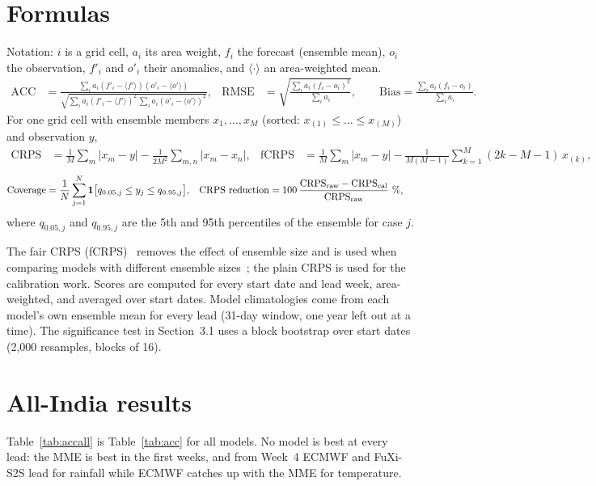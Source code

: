 \documentclass[11pt,a4paper]{article}
\begin{document}
\section{Formulas}
\label{app:scores}
Notation: $i$ is a grid cell, $a_i$ its area weight, $f_i$ the forecast (ensemble mean), $o_i$ the observation, $f'_i$ and $o'_i$
their anomalies, and $\langle\cdot\rangle$ an area-weighted mean.
\begin{align*}
\mathrm{ACC}&=\frac{\sum_i a_i(f'_i-\langle f'\rangle)(o'_i-\langle o'\rangle)}
{\sqrt{\sum_i a_i(f'_i-\langle f'\rangle)^2\,\sum_i a_i(o'_i-\langle o'\rangle)^2}}, &
\mathrm{RMSE}&=\sqrt{\frac{\sum_i a_i(f_i-o_i)^2}{\sum_i a_i}}, \qquad
\mathrm{Bias}=\frac{\sum_i a_i(f_i-o_i)}{\sum_i a_i}.
\end{align*}
For one grid cell with ensemble members $x_1,\dots,x_M$ (sorted: $x_{(1)}\le\dots\le x_{(M)}$) and observation $y$,
\begin{align*}
\mathrm{CRPS}&=\frac{1}{M}\sum_{m}|x_m-y|-\frac{1}{2M^2}\sum_{m,n}|x_m-x_n|, &
\mathrm{fCRPS}&=\frac{1}{M}\sum_{m}|x_m-y|-\frac{1}{M(M-1)}\sum_{k=1}^{M}(2k-M-1)\,x_{(k)},
\end{align*}
\vspace{-0.8\baselineskip}
\begin{align*}
\mathrm{Coverage}&=\frac{1}{N}\sum_{j=1}^{N}\mathbf{1}\big[q_{0.05,j}\le y_j\le q_{0.95,j}\big], &
\text{CRPS reduction}&=100\,\frac{\mathrm{CRPS}_{\rm raw}-\mathrm{CRPS}_{\rm cal}}{\mathrm{CRPS}_{\rm raw}}\ \%,
\end{align*}
where $q_{0.05,j}$ and $q_{0.95,j}$ are the 5th and 95th percentiles of the ensemble for case $j$.

The fair CRPS (fCRPS)~\cite{ferro2014fair} removes the effect of ensemble size and is used when comparing models with
different ensemble sizes~\cite{raj2026bench}; the plain CRPS is used for the calibration work. Scores are computed for every start date and lead week, area-weighted, and averaged over start
dates. Model climatologies come from each model's own ensemble mean for every lead (31-day window, one year left out at a time).
The significance test in Section~3.1 uses a block bootstrap over start dates (2,000 resamples, blocks of 16).

\section{All-India results}
\label{app:results}
Table~\ref{tab:accall} is Table~\ref{tab:acc} for all models. No model is best at every lead: the MME is best in the first
weeks, and from Week~4 ECMWF and FuXi-S2S lead for rainfall while ECMWF catches up with the MME for temperature.
\end{document}

